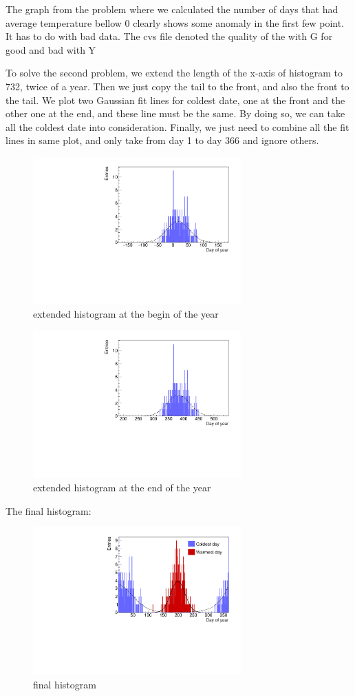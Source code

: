 \documentclass[a4paper]{article}
\begin{document}
\begin{enumerate}
The graph from the problem where we calculated the number of days that had average temperature bellow 0 clearly shows some anomaly in the first few point. It has to do with bad data. The cvs file denoted the quality of the with G for good and bad with Y 



To solve the second problem, we extend the length of the x-axis of histogram to 732, twice of a year. Then we just copy the tail to the front, and also the front to the tail. We plot two Gaussian fit lines for coldest date, one at the front and the other one at the end, and these line must be the same. By doing so, we can take all the coldest date into consideration. Finally, we just need to combine all the fit lines in same plot, and only take from day 1 to day 366 and ignore others.
\begin{figure}[htp]
    \centering
    \includegraphics[width=8cm]{./images/hotCold_Upp_cold_1}
    \caption{extended histogram at the begin of the year}
    \label{fig:hist}
\end{figure}
\begin{figure}[htp]
    \centering
    \includegraphics[width=8cm]{./images/hotCold_Upp_cold_2}
    \caption{extended histogram at the end of the year}
    \label{fig:hist}
\end{figure}

The final histogram:
\begin{figure}[htp]
    \centering
    \includegraphics[width=8cm]{./images/hotCold_Upp_final}
    \caption{final histogram}
    \label{fig:hist}
\end{figure}
\end{enumerate}
\end{document}
